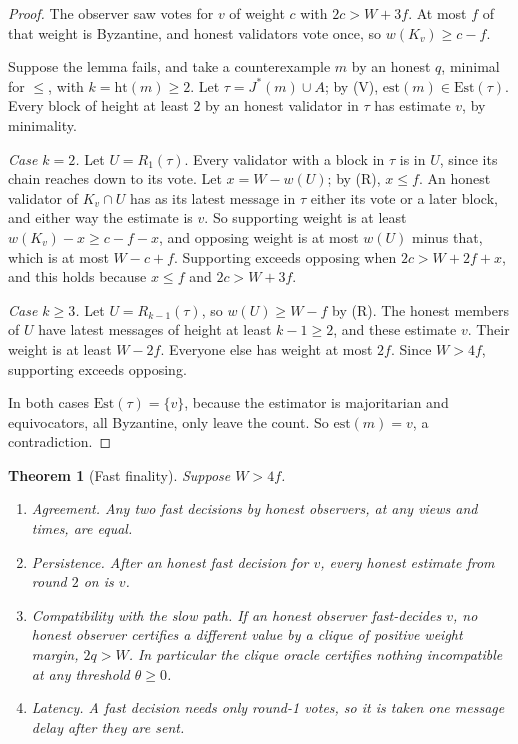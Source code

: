 \documentclass[11pt]{article}
\newtheorem{theorem}{Theorem}[section]
\theoremstyle{definition}
\theoremstyle{remark}
\newcommand{\Jst}{J^{*}}
\newcommand{\est}{\mathrm{est}}
\newcommand{\Est}{\mathrm{Est}}
\newcommand{\hgt}{\mathrm{ht}}
\begin{document}
\begin{proof}
The observer saw votes for $v$ of weight $c$ with $2c>W+3f$. At most $f$ of
that weight is Byzantine, and honest validators vote once, so
$w(K_v)\ge c-f$.

Suppose the lemma fails, and take a counterexample $m$ by an honest $q$, minimal
for $\le$, with $k=\hgt(m)\ge2$. Let $\tau=\Jst(m)\cup A$; by (V),
$\est(m)\in\Est(\tau)$. Every block of height at least $2$ by an honest
validator in $\tau$ has estimate $v$, by minimality.

\emph{Case $k=2$.} Let $U=R_1(\tau)$. Every validator with a block in $\tau$ is
in $U$, since its chain reaches down to its vote. Let $x=W-w(U)$; by (R),
$x\le f$. An honest validator of $K_v\cap U$ has as its latest message in
$\tau$ either its vote or a later block, and either way the estimate is $v$.
So supporting weight is at least $w(K_v)-x\ge c-f-x$, and opposing weight is at
most $w(U)$ minus that, which is at most $W-c+f$. Supporting exceeds opposing
when $2c>W+2f+x$, and this holds because $x\le f$ and $2c>W+3f$.

\emph{Case $k\ge3$.} Let $U=R_{k-1}(\tau)$, so $w(U)\ge W-f$ by (R). The
honest members of $U$ have latest messages of height at least $k-1\ge2$, and
these estimate $v$. Their weight is at least $W-2f$. Everyone else has weight
at most $2f$. Since $W>4f$, supporting exceeds opposing.

In both cases $\Est(\tau)=\{v\}$, because the estimator is majoritarian and
equivocators, all Byzantine, only leave the count. So $\est(m)=v$, a
contradiction.
\end{proof}

\begin{theorem}[Fast finality]\label{thm:fast}
Suppose $W>4f$.
\begin{enumerate}[label=(\roman*)]
\item \emph{Agreement.} Any two fast decisions by honest observers, at any
  views and times, are equal.
\item \emph{Persistence.} After an honest fast decision for $v$, every honest
  estimate from round $2$ on is $v$.
\item \emph{Compatibility with the slow path.} If an honest observer
  fast-decides $v$, no honest observer certifies a different value by a clique
  of positive weight margin, $2q>W$. In particular the clique oracle certifies
  nothing incompatible at any threshold $\theta\ge0$.
\item \emph{Latency.} A fast decision needs only round-1 votes, so it is taken
  one message delay after they are sent.
\end{enumerate}
\end{theorem}
\end{document}
